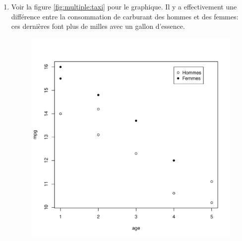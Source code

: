 \begin{solution}{3.18}
    \begin{enumerate}
    \item Voir la figure \ref{fig:multiple:taxi} pour le graphique. Il
      y a effectivement une différence entre la consommation de
      carburant des hommes et des femmes: ces dernières font plus de
      milles avec un gallon d'essence.
      \begin{figure}
        \centering
\begin{knitrout}
\color{fgcolor}\begin{kframe}
\begin{alltt}
 \hlkwb{<-}  \hlopt{==} \hlstd{)}
 \hlkwb{<-}  \hlopt{==} \hlstd{)}
 \hlopt{~}   
      \hlstd{=} \hlopt{$}  \hlstd{=} \hlopt{$}
 \hlopt{~}     \hlstd{=} \hlstd{)}
\hlstd{(}\hlstd{,} \hlstd{,}  \hlstd{=} \hlstd{(}\hlstd{,} \hlstd{),}  \hlstd{=} \hlstd{(}\hlstd{,} \hlstd{))}
\end{alltt}
\end{kframe}
\includegraphics[width=\maxwidth]{figure/unnamed-chunk-49-1}


\end{knitrout}
\end{figure}
\end{enumerate}
\end{solution}
